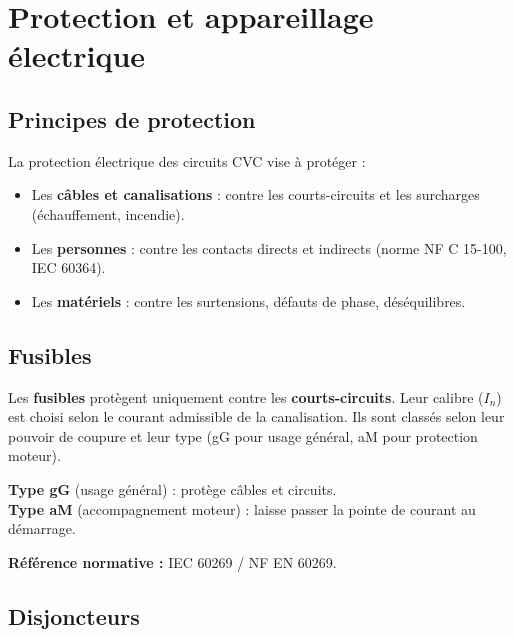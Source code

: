 \section{Protection et appareillage électrique}

\subsection{Principes de protection}

\begin{definition}
  La protection électrique des circuits CVC vise à protéger :
  \begin{itemize}
    \item Les \textbf{câbles et canalisations} : contre les courts-circuits et les surcharges (échauffement, incendie).
    \item Les \textbf{personnes} : contre les contacts directs et indirects (norme NF C 15-100, IEC 60364).
    \item Les \textbf{matériels} : contre les surtensions, défauts de phase, déséquilibres.
  \end{itemize}
\end{definition}

\subsection{Fusibles}

\begin{definition}
  Les \textbf{fusibles} protègent uniquement contre les \textbf{courts-circuits}. Leur calibre ($I_n$) est choisi selon le courant admissible de la canalisation. Ils sont classés selon leur pouvoir de coupure et leur type (gG pour usage général, aM pour protection moteur).

  \textbf{Type gG} (usage général) : protège câbles et circuits.\\
  \textbf{Type aM} (accompagnement moteur) : laisse passer la pointe de courant au démarrage.

  \textbf{Référence normative :} IEC 60269 / NF EN 60269.
\end{definition}

\subsection{Disjoncteurs}

